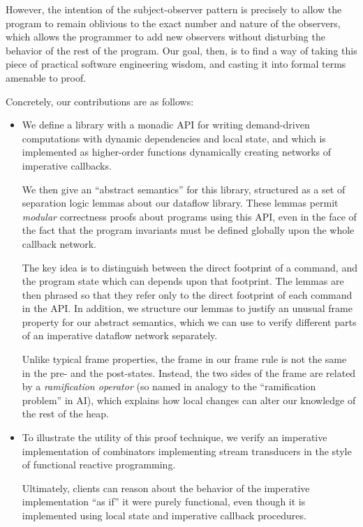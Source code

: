However, the intention of the subject-observer pattern is precisely to
allow the program to remain oblivious to the exact number and nature
of the observers, which allows the programmer to add new observers
without disturbing the behavior of the rest of the program.  Our goal,
then, is to find a way of taking this piece of practical software
engineering wisdom, and casting it into formal terms amenable to
proof.

Concretely, our contributions are as follows: 

\begin{itemize}
  \item We define a library with a monadic API for writing
    demand-driven computations with dynamic dependencies and local
    state, and which is implemented as higher-order functions
    dynamically creating networks of imperative callbacks.

    We then give an ``abstract semantics'' for this
    library, structured as a set of separation logic lemmas about our
    dataflow library. These lemmas permit \emph{modular} correctness
    proofs about programs using this API, even in the face of the fact
    that the program invariants must be defined globally upon the
    whole callback network.

    The key idea is to distinguish between the direct footprint of a
    command, and the program state which can depends upon that
    footprint. The lemmas are then phrased so that they refer only to
    the direct footprint of each command in the API. In addition, we
    structure our lemmas to justify an unusual frame property for our
    abstract semantics, which we can use to verify different parts of
    an imperative dataflow network separately.

    Unlike typical frame properties, the frame in our frame rule is
    not the same in the pre- and the post-states. Instead, the two
    sides of the frame are related by a \emph{ramification operator}
    (so named in analogy to the ``ramification problem'' in AI), which
    explains how local changes can alter our knowledge of the rest of
    the heap.

  \item To illustrate the utility of this proof technique, we verify
    an imperative implementation of combinators implementing stream
    transducers in the style of functional reactive programming. 

    Ultimately, clients can reason about the behavior of the imperative
    implementation ``as if'' it were purely functional, even though it
    is implemented using local state and imperative callback
    procedures.
\end{itemize}

